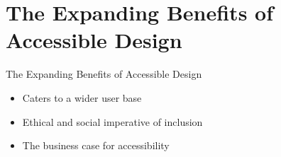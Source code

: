 \documentclass{beamer}
\begin{document}
\section{The Expanding Benefits of Accessible Design}
\begin{frame}{The Expanding Benefits of Accessible Design}
    \begin{itemize}
        \item Caters to a wider user base
        \item Ethical and social imperative of inclusion
        \item The business case for accessibility
    \end{itemize}
\end{frame}
\end{document}
